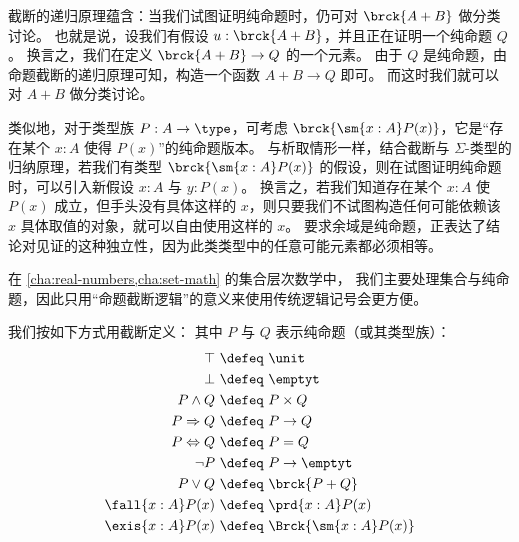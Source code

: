 截断的递归原理蕴含：当我们试图证明纯命题时，仍可对 $\brck{A+B}$ 做分类讨论。
也就是说，设我们有假设 $u:\brck{A+B}$，并且正在证明一个纯命题 $Q$。
换言之，我们在定义 $\brck{A+B} \to Q$ 的一个元素。
由于 $Q$ 是纯命题，由命题截断的递归原理可知，构造一个函数 $A+B\to Q$ 即可。
而这时我们就可以对 $A+B$ 做分类讨论。

类似地，对于类型族 $P:A\to\type$，可考虑 $\brck{\sm{x:A} P(x)}$，它是“存在某个 $x:A$ 使得 $P(x)$”的纯命题版本。
与析取情形一样，结合截断与 $\Sigma$-类型的归纳原理，若我们有类型 $\brck{\sm{x:A} P(x)}$ 的假设，则在试图证明纯命题时，可以引入新假设 $x:A$ 与 $y:P(x)$。
换言之，若我们知道存在某个 $x:A$ 使 $P(x)$ 成立，但手头没有具体这样的 $x$，则只要我们不试图构造任何可能依赖该 $x$ 具体取值的对象，就可以自由使用这样的 $x$。
要求余域是纯命题，正表达了结论对见证的这种独立性，因为此类类型中的任意可能元素都必须相等。

在 \cref{cha:real-numbers,cha:set-math} 的集合层次数学中，
我们主要处理集合与纯命题，因此只用“命题截断逻辑”的意义来使用传统逻辑记号会更方便。

\begin{defn} \label{defn:logical-notation}
  我们按如下方式用截断定义：
  其中 $P$ 与 $Q$ 表示纯命题（或其类型族）：
  {\allowdisplaybreaks
  \begin{align*}
    \top            &\ \defeq \ \unit \\
    \bot            &\ \defeq \ \emptyt \\
    P \land Q       &\ \defeq \ P \times Q \\
    P \Rightarrow Q &\ \defeq \ P \to Q \\
    P \Leftrightarrow Q &\ \defeq \ P = Q \\
    \neg P          &\ \defeq \ P \to \emptyt \\
    P \lor Q        &\ \defeq \ \brck{P + Q} \\
    \fall{x : A} P(x) &\ \defeq \ \prd{x : A} P(x) \\
    \exis{x : A} P(x) &\ \defeq \ \Brck{\sm{x : A} P(x)}
  \end{align*}}
\end{defn}

